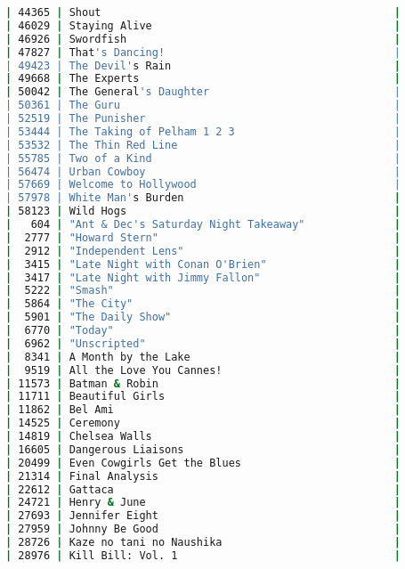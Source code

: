 \begin{lstlisting}[language=bash]
| 44365 | Shout                                              |
| 46029 | Staying Alive                                      |
| 46926 | Swordfish                                          |
| 47827 | That's Dancing!                                    |
| 49423 | The Devil's Rain                                   |
| 49668 | The Experts                                        |
| 50042 | The General's Daughter                             |
| 50361 | The Guru                                           |
| 52519 | The Punisher                                       |
| 53444 | The Taking of Pelham 1 2 3                         |
| 53532 | The Thin Red Line                                  |
| 55785 | Two of a Kind                                      |
| 56474 | Urban Cowboy                                       |
| 57669 | Welcome to Hollywood                               |
| 57978 | White Man's Burden                                 |
| 58123 | Wild Hogs                                          |
|   604 | "Ant & Dec's Saturday Night Takeaway"              |
|  2777 | "Howard Stern"                                     |
|  2912 | "Independent Lens"                                 |
|  3415 | "Late Night with Conan O'Brien"                    |
|  3417 | "Late Night with Jimmy Fallon"                     |
|  5222 | "Smash"                                            |
|  5864 | "The City"                                         |
|  5901 | "The Daily Show"                                   |
|  6770 | "Today"                                            |
|  6962 | "Unscripted"                                       |
|  8341 | A Month by the Lake                                |
|  9519 | All the Love You Cannes!                           |
| 11573 | Batman & Robin                                     |
| 11711 | Beautiful Girls                                    |
| 11862 | Bel Ami                                            |
| 14525 | Ceremony                                           |
| 14819 | Chelsea Walls                                      |
| 16605 | Dangerous Liaisons                                 |
| 20499 | Even Cowgirls Get the Blues                        |
| 21314 | Final Analysis                                     |
| 22612 | Gattaca                                            |
| 24721 | Henry & June                                       |
| 27693 | Jennifer Eight                                     |
| 27959 | Johnny Be Good                                     |
| 28726 | Kaze no tani no Naushika                           |
| 28976 | Kill Bill: Vol. 1                                  |

\end{lstlisting}
